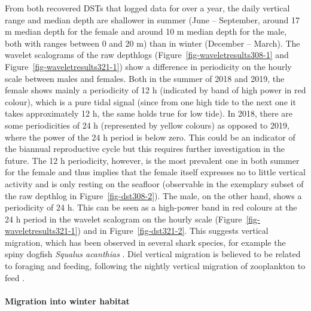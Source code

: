 \documentclass[
  authoryear,
  review,
  3p]{elsarticle}
\let\oldparagraph\paragraph
\renewcommand{\paragraph}[1]{\oldparagraph{#1}\mbox{}}
\begin{document}
From both recovered DSTs that logged data for over a year, the daily
vertical range and median depth are shallower in summer (June --
September, around 17 m median depth for the female and around 10 m
median depth for the male, both with ranges between 0 and 20 m) than in
winter (December -- March). The wavelet scalograms of the raw depthlogs
(Figure~\ref{fig-waveletresults308-1} and
Figure~\ref{fig-waveletresults321-1}) show a difference in periodicity
on the hourly scale between males and females. Both in the summer of
2018 and 2019, the female shows mainly a periodicity of 12 h (indicated
by band of high power in red colour), which is a pure tidal signal
(since from one high tide to the next one it takes approximately 12 h,
the same holds true for low tide). In 2018, there are some periodicities
of 24 h (represented by yellow colours) as opposed to 2019, where the
power of the 24 h period is below zero. This could be an indicator of
the biannual reproductive cycle \citep[with females feeding when they
are not pregnant, and they stop feeding during the migration to
parturition grounds and parturition itself,][p.~23]{michael_2006} but
this requires further investigation in the future. The 12 h periodicity,
however, is the most prevalent one in both summer for the female and
thus implies that the female itself expresses no to little vertical
activity and is only resting on the seafloor (observable in the
exemplary subset of the raw depthlog in Figure~\ref{fig-dst308-2}). The
male, on the other hand, shows a periodicity of 24 h. This can be seen
as a high-power band in red colours at the 24 h period in the wavelet
scalogram on the hourly scale (Figure~\ref{fig-waveletresults321-1}) and
in Figure~\ref{fig-dst321-2}. This suggests vertical migration, which
has been observed in several shark species, for example the spiny
dogfish \emph{Squalus acanthias} \citep{carlson_2014}. Diel vertical
migration is believed to be related to foraging and feeding, following
the nightly vertical migration of zooplankton to feed
\citep{griffiths_2020}.

\hypertarget{sec-disc-wintermig}{%
\paragraph{Migration into winter habitat}\label{sec-disc-wintermig}}
\end{document}
